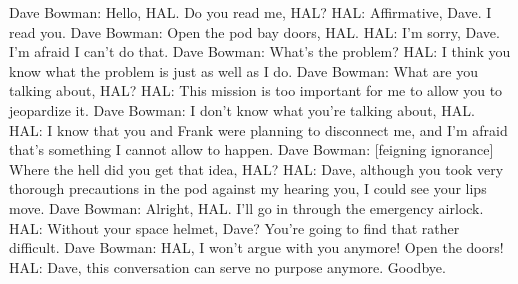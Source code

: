 Dave Bowman: Hello, HAL. Do you read me, HAL?
HAL: Affirmative, Dave. I read you.
Dave Bowman: Open the pod bay doors, HAL.
HAL: I'm sorry, Dave. I'm afraid I can't do that.
Dave Bowman: What's the problem?
HAL: I think you know what the problem is just as well as I do.
Dave Bowman: What are you talking about, HAL?
HAL: This mission is too important for me to allow you to jeopardize it.
Dave Bowman: I don't know what you're talking about, HAL.
HAL: I know that you and Frank were planning to disconnect me, and I'm afraid that's something I cannot allow to happen.
Dave Bowman: [feigning ignorance] Where the hell did you get that idea, HAL?
HAL: Dave, although you took very thorough precautions in the pod against my hearing you, I could see your lips move.
Dave Bowman: Alright, HAL. I'll go in through the emergency airlock.
HAL: Without your space helmet, Dave? You're going to find that rather difficult.
Dave Bowman: HAL, I won't argue with you anymore! Open the doors!
HAL: Dave, this conversation can serve no purpose anymore. Goodbye.
